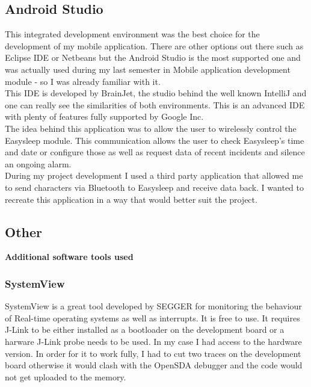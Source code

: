 \documentclass[12pt,a4paper]{article}
\begin{document}
		\subsection{Android Studio} 
		This integrated development environment was the best choice for the development of my mobile application. There are other options out there such as Eclipse IDE or Netbeans but the Android Studio is the most supported one and was actually used during my last semester in Mobile application development module - so I was already familiar with it.\\ 
		
		This IDE is developed by BrainJet, the studio behind the well known IntelliJ and one can really see the similarities of both environments. This is an advanced IDE with plenty of features fully supported by Google Inc.\\ 
		
		The idea behind this application was to allow the user to wirelessly control the Easysleep module. This communication allows the user to check Easysleep's time and date or configure those as well as request data of recent incidents and silence an ongoing alarm.\\
		
		During my project development I used a third party application that allowed me to send characters via Bluetooth to Easysleep and receive data back. I wanted to recreate this application in a way that would better suit the project.\\ 
		\newpage
		
		\subsection{Other}
		{\bfseries Additional software tools used}
		
            \subsubsection{SystemView}
            SystemView is a great tool developed by SEGGER for monitoring the behaviour of Real-time operating systems as well as interrupts. It is free to use. It requires J-Link to be either installed as a bootloader on the development board or a harware J-Link probe needs to be used. In my case I had access to the hardware version. In order for it to work fully, I had to cut two traces on the development board otherwise it would clash with the OpenSDA debugger and the code would not get uploaded to the memory.
                    
\end{document}
